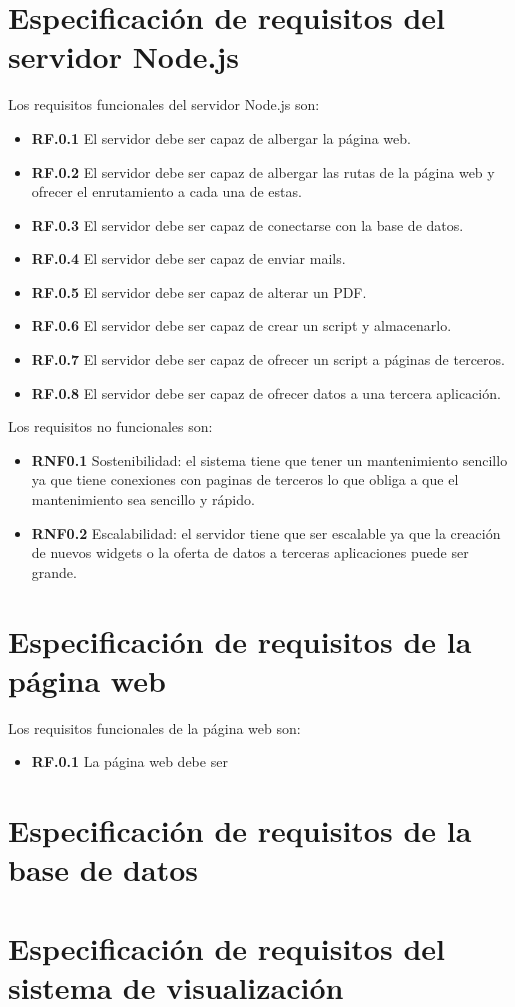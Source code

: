\section{Especificación de requisitos del servidor Node.js}
Los requisitos funcionales del servidor Node.js son:

\begin{itemize}
	\item \textbf{RF.0.1} El servidor debe ser capaz de albergar la página web.
	\item \textbf{RF.0.2} El servidor debe ser capaz de albergar las rutas de la página web y ofrecer el enrutamiento a cada una de estas.
	\item \textbf{RF.0.3} El servidor debe ser capaz de conectarse con la base de datos.
	\item \textbf{RF.0.4} El servidor debe ser capaz de enviar mails.
	\item \textbf{RF.0.5} El servidor debe ser capaz de alterar un PDF.
	\item \textbf{RF.0.6} El servidor debe ser capaz de crear un script y almacenarlo.
	\item \textbf{RF.0.7} El servidor debe ser capaz de ofrecer un script a páginas de terceros.
	\item \textbf{RF.0.8} El servidor debe ser capaz de ofrecer datos a una tercera aplicación.
\end{itemize}

Los requisitos no funcionales son:

\begin{itemize}
	\item \textbf{RNF0.1} Sostenibilidad: el sistema tiene que tener un mantenimiento sencillo ya que tiene conexiones con paginas de terceros lo que obliga a que el mantenimiento sea sencillo y rápido.
	\item \textbf{RNF0.2} Escalabilidad: el servidor tiene que ser escalable ya que la creación de nuevos widgets o la oferta de datos a terceras aplicaciones puede ser grande.
\end{itemize}



\section{Especificación de requisitos de la página web}

Los requisitos funcionales de la página web son:

\begin{itemize}
	\item \textbf{RF.0.1} La página web debe ser 
\end{itemize}



\section{Especificación de requisitos de la base de datos}

\section{Especificación de requisitos del sistema de visualización}